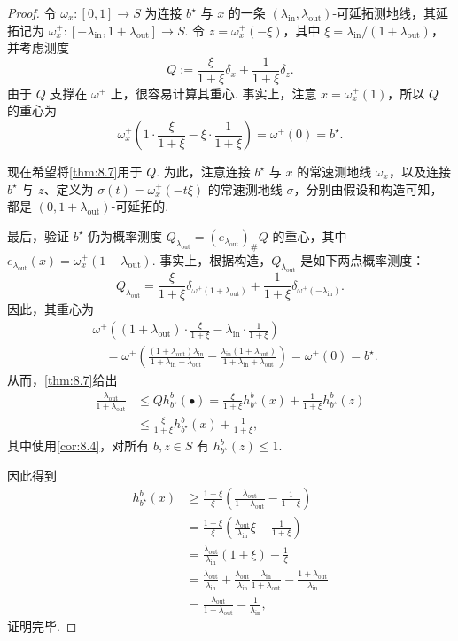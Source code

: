 \begin{proof}
令 $\omega_x:[0,1]\to S$ 为连接 $b^\star$ 与 $x$ 的一条 $(\lambda_{\mathrm{in}},\lambda_{\mathrm{out}})$-可延拓测地线，其延拓记为 $\omega_x^+:[-\lambda_{\mathrm{in}},1+\lambda_{\mathrm{out}}]\to S$. 令 $z=\omega_x^+(-\xi)$，其中 $\xi=\lambda_{\mathrm{in}}/(1+\lambda_{\mathrm{out}})$，并考虑测度
$$Q:=\frac\xi{1+\xi}\delta_x+\frac1{1+\xi}\delta_z.$$
由于 $Q$ 支撑在 $\omega^+$ 上，很容易计算其重心. 事实上，注意 $x=\omega_x^+(1)$，所以 $Q$ 的重心为
$$\omega_x^+\left(1\cdot\frac\xi{1+\xi}-\xi\cdot\frac1{1+\xi}\right)
=\omega^+(0)=b^\star.$$

现在希望将\autoref{thm:8.7}用于 $Q$. 为此，注意连接 $b^\star$ 与 $x$ 的常速测地线 $\omega_x$，以及连接 $b^\star$ 与 $z$、定义为 $\sigma(t)=\omega_x^+(-t\xi)$ 的常速测地线 $\sigma$，分别由假设和构造可知，都是 $(0,1+\lambda_{\mathrm{out}})$-可延拓的.

最后，验证 $b^\star$ 仍为概率测度 $Q_{\lambda_{\mathrm{out}}}=(e_{\lambda_{\mathrm{out}}})_\#Q$ 的重心，其中 $e_{\lambda_{\mathrm{out}}}(x)=\omega_x^+(1+\lambda_{\mathrm{out}})$. 事实上，根据构造，$Q_{\lambda_{\mathrm{out}}}$ 是如下两点概率测度：
$$Q_{\lambda_{\mathrm{out}}}=\frac\xi{1+\xi}\delta_{\omega^+(1+\lambda_{\mathrm{out}})}
+\frac1{1+\xi}\delta_{\omega^+(-\lambda_{\mathrm{in}})}.$$
因此，其重心为
$$\begin{aligned}
&\omega^+\left((1+\lambda_{\mathrm{out}})\cdot\frac\xi{1+\xi}
-\lambda_{\mathrm{in}}\cdot\frac1{1+\xi}\right)\\
&\quad=\omega^+\left(\frac{(1+\lambda_{\mathrm{out}})\lambda_{\mathrm{in}}}{1+\lambda_{\mathrm{in}}+\lambda_{\mathrm{out}}}
-\frac{\lambda_{\mathrm{in}}(1+\lambda_{\mathrm{out}})}{1+\lambda_{\mathrm{in}}+\lambda_{\mathrm{out}}}\right)
=\omega^+(0)=b^\star.
\end{aligned}$$
从而，\autoref{thm:8.7}给出
$$\begin{aligned}
\frac{\lambda_{\mathrm{out}}}{1+\lambda_{\mathrm{out}}}
&\le Qh_{b^\star}^b(\bullet)
=\frac\xi{1+\xi}h_{b^\star}^b(x)+\frac1{1+\xi}h_{b^\star}^b(z)\\
&\le\frac\xi{1+\xi}h_{b^\star}^b(x)+\frac1{1+\xi},
\end{aligned}$$
其中使用\autoref{cor:8.4}，对所有 $b,z\in S$ 有 $h_{b^\star}^b(z)\le1$.

因此得到
$$\begin{aligned}
h_{b^\star}^b(x)&\ge\frac{1+\xi}\xi
\left(\frac{\lambda_{\mathrm{out}}}{1+\lambda_{\mathrm{out}}}-\frac1{1+\xi}\right)\\
&=\frac{1+\xi}\xi\left(\frac{\lambda_{\mathrm{out}}}{\lambda_{\mathrm{in}}}\xi-\frac1{1+\xi}\right)\\
&=\frac{\lambda_{\mathrm{out}}}{\lambda_{\mathrm{in}}}(1+\xi)-\frac1\xi\\
&=\frac{\lambda_{\mathrm{out}}}{\lambda_{\mathrm{in}}}
+\frac{\lambda_{\mathrm{out}}}{\lambda_{\mathrm{in}}}
\frac{\lambda_{\mathrm{in}}}{1+\lambda_{\mathrm{out}}}
-\frac{1+\lambda_{\mathrm{out}}}{\lambda_{\mathrm{in}}}\\
&=\frac{\lambda_{\mathrm{out}}}{1+\lambda_{\mathrm{out}}}-\frac1{\lambda_{\mathrm{in}}},
\end{aligned}$$
证明完毕.
\end{proof}

